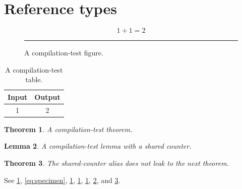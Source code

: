 \documentclass{article}
\newtheorem{theorem}{Theorem}[section]
\newtheorem{lemma}[theorem]{Lemma}
\begin{document}
\section{Reference types}
\label{sec:specimen}
\begin{equation}
  1 + 1 = 2
  \label{eq:specimen}
\end{equation}
\begin{figure}[ht]
  \centering\rule{1cm}{1cm}
  \caption{A compilation-test figure.}
  \label{fig:specimen}
\end{figure}
\begin{table}[ht]
  \centering
  \caption{A compilation-test table.}
  \label{tab:specimen}
  \begin{tabular}{cc}
    \toprule
    Input & Output \\
    \midrule
    1 & 2 \\
    \bottomrule
  \end{tabular}
\end{table}
\begin{theorem}
  \label{thm:specimen}
  A compilation-test theorem.
\end{theorem}
\begin{lemma}
  \label{lem:specimen}
  A compilation-test lemma with a shared counter.
\end{lemma}
\begin{theorem}
  \label{thm:after-lemma}
  The shared-counter alias does not leak to the next theorem.
\end{theorem}
See \cref{sec:specimen}, \cref{eq:specimen}, \cref{fig:specimen}, \cref{tab:specimen}, \cref{thm:specimen}, \cref{lem:specimen}, and \cref{thm:after-lemma}.
\end{document}
